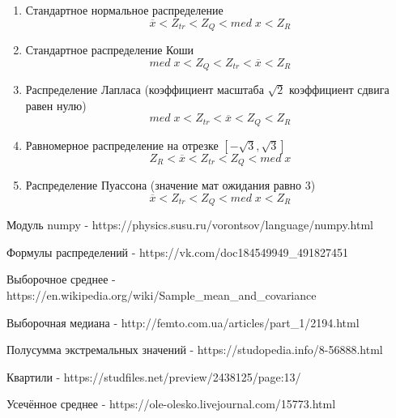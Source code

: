 \documentclass[a4]{article}
\begin{document}
\begin{enumerate}
    \item Стандартное нормальное распределение $$\overline{x} < Z_{tr} < Z_Q < med\;x < Z_R$$
    
    \item Стандартное распределение Коши $$med\;x < Z_Q < Z_{tr} < \overline{x} < Z_R$$
    
    \item Распределение Лапласа (коэффициент масштаба $\sqrt{2}$ коэффициент сдвига равен нулю) $$med\;x < Z_{tr} < \overline{x} < Z_Q < Z_R$$
    
    \item Равномерное распределение на отрезке $\left[-\sqrt{3},\sqrt{3}\right]$ $$Z_R < \overline{x} < Z_{tr} < Z_Q < med\;x$$
    
    \item Распределение Пуассона (значение мат ожидания равно $3$) $$\overline{x} < Z_{tr} < Z_Q < med\;x < Z_R$$
    
\end{enumerate}



\begin{thebibliography}{}
      Модуль numpy  -  https://physics.susu.ru/vorontsov/language/numpy.html
    
    Формулы распределений  -  https://vk.com/doc184549949\_491827451
    
    Выборочное среднее  -  https://en.wikipedia.org/wiki/Sample\_mean\_and\_covariance
    
    Выборочная медиана  -  http://femto.com.ua/articles/part\_1/2194.html
    
    Полусумма экстремальных значений  -  https://studopedia.info/8-56888.html
    
    Квартили  -  https://studfiles.net/preview/2438125/page:13/
    
      Усечённое среднее  -  https://ole-olesko.livejournal.com/15773.html
\end{thebibliography}



\end{document}
